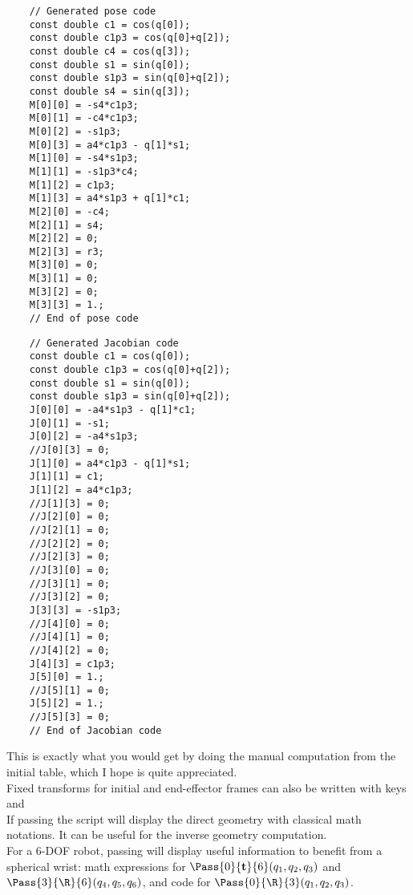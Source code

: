 \documentclass{ecnreport}
\begin{document}
  \begin{minipage}{.45\linewidth}
    \cppstyle \raggedright
    \begin{lstlisting}
    // Generated pose code
    const double c1 = cos(q[0]);
    const double c1p3 = cos(q[0]+q[2]);
    const double c4 = cos(q[3]);
    const double s1 = sin(q[0]);
    const double s1p3 = sin(q[0]+q[2]);
    const double s4 = sin(q[3]);
    M[0][0] = -s4*c1p3;
    M[0][1] = -c4*c1p3;
    M[0][2] = -s1p3;
    M[0][3] = a4*c1p3 - q[1]*s1;
    M[1][0] = -s4*s1p3;
    M[1][1] = -s1p3*c4;
    M[1][2] = c1p3;
    M[1][3] = a4*s1p3 + q[1]*c1;
    M[2][0] = -c4;
    M[2][1] = s4;
    M[2][2] = 0;
    M[2][3] = r3;
    M[3][0] = 0;
    M[3][1] = 0;
    M[3][2] = 0;
    M[3][3] = 1.;
    // End of pose code
    \end{lstlisting}
  \end{minipage}
  \begin{minipage}{.1\linewidth}
    \quad\quad
  \end{minipage}
  \begin{minipage}{.45\linewidth}
    \cppstyle \raggedright
    \begin{lstlisting}
    // Generated Jacobian code
    const double c1 = cos(q[0]);
    const double c1p3 = cos(q[0]+q[2]);
    const double s1 = sin(q[0]);
    const double s1p3 = sin(q[0]+q[2]);
    J[0][0] = -a4*s1p3 - q[1]*c1;
    J[0][1] = -s1;
    J[0][2] = -a4*s1p3;
    //J[0][3] = 0;
    J[1][0] = a4*c1p3 - q[1]*s1;
    J[1][1] = c1;
    J[1][2] = a4*c1p3;
    //J[1][3] = 0;
    //J[2][0] = 0;
    //J[2][1] = 0;
    //J[2][2] = 0;
    //J[2][3] = 0;
    //J[3][0] = 0;
    //J[3][1] = 0;
    //J[3][2] = 0;
    J[3][3] = -s1p3;
    //J[4][0] = 0;
    //J[4][1] = 0;
    //J[4][2] = 0;
    J[4][3] = c1p3;
    J[5][0] = 1.;
    //J[5][1] = 0;
    J[5][2] = 1.;
    //J[5][3] = 0;
    // End of Jacobian code
    \end{lstlisting}
  \end{minipage}
  This is exactly what you would get by doing the manual computation from the initial table, which I hope is quite appreciated.\\

  Fixed transforms for initial and end-effector frames can also be written with keys  and \\

  If passing  the script will display the direct geometry with classical math notations. It can be useful for the inverse geometry computation.\\
  For a 6-DOF robot, passing  will display useful information to benefit from a spherical wrist: math expressions for $\Pass{0}{\mathbf{t}}{6}(q_1,q_2,q_3)$ and  $\Pass{3}{\R}{6}(q_4,q_5,q_6)$, and code for $\Pass{0}{\R}{3}(q_1,q_2,q_3)$.
\end{document}
